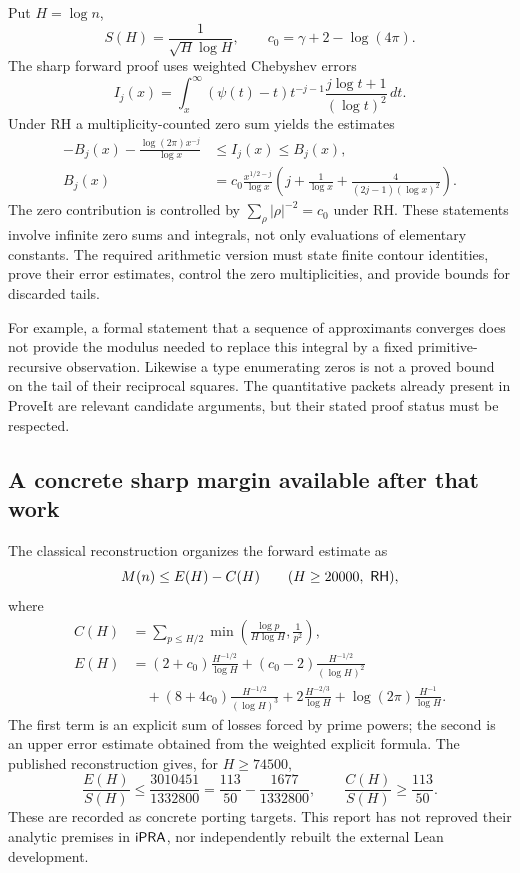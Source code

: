 Put $H=\log n$,
\[
 S(H)=\frac1{\sqrt H\log H},
 \qquad c_0=\gamma+2-\log(4\pi).
\]
The sharp forward proof uses weighted Chebyshev errors
\[
 I_j(x)=\int_x^\infty(\psi(t)-t)t^{-j-1}
                      \frac{j\log t+1}{(\log t)^2}\,dt.
\]
Under RH a multiplicity-counted zero sum yields the estimates
\begin{align*}
 -B_j(x)-\frac{\log(2\pi)x^{-j}}{\log x}
 &\le I_j(x)\le B_j(x),\\
 B_j(x)&=c_0\frac{x^{1/2-j}}{\log x}
       \left(j+\frac1{\log x}
                  +\frac4{(2j-1)(\log x)^2}\right).
\end{align*}
The zero contribution is controlled by
$\sum_\rho|\rho|^{-2}=c_0$ under RH. These statements involve
infinite zero sums and integrals, not only evaluations of elementary
constants. The required arithmetic version must state finite contour
identities, prove their error estimates, control the zero multiplicities,
and provide bounds for discarded tails.

For example, a formal statement that a sequence of approximants converges
does not provide the modulus needed to replace this integral by a fixed
primitive-recursive observation. Likewise a type enumerating zeros is
not a proved bound on the tail of their reciprocal squares. The
quantitative packets already present in ProveIt are relevant candidate
arguments, but their stated proof status must be respected.

\subsection{A concrete sharp margin available after that work}

The classical reconstruction \cite{Whidden} organizes the forward estimate
as
\begin{equation}\label{eq:budget}
 M(n)\le E(H)-C(H)\qquad(H\ge20000,\ \mathsf{RH}),
\end{equation}
where
\begin{align*}
 C(H)&=\sum_{p\le H/2}
       \min\left(\frac{\log p}{H\log H},\frac1{p^2}\right),\\
 E(H)&=(2+c_0)\frac{H^{-1/2}}{\log H}
       +(c_0-2)\frac{H^{-1/2}}{(\log H)^2}\\
 &\quad +(8+4c_0)\frac{H^{-1/2}}{(\log H)^3}
       +2\frac{H^{-2/3}}{\log H}
       +\log(2\pi)\frac{H^{-1}}{\log H}.
\end{align*}
The first term is an explicit sum of losses forced by prime powers;
the second is an upper error estimate obtained from the weighted
explicit formula. The published reconstruction gives, for $H\ge74500$,
\begin{equation}\label{eq:rational-budgets}
 \frac{E(H)}{S(H)}
 \le\frac{3010451}{1332800}
 =\frac{113}{50}-\frac{1677}{1332800},
 \qquad
 \frac{C(H)}{S(H)}\ge\frac{113}{50}.
\end{equation}
These are recorded as concrete porting targets. This report has not
reproved their analytic premises in $\mathsf{iPRA}$, nor independently rebuilt
the external Lean development.

